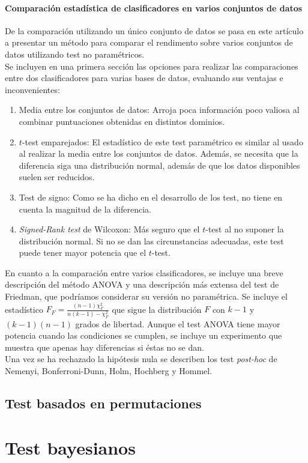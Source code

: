 \paragraph{Comparación estadística de clasificadores en varios conjuntos de datos} \cite{DEMSAR06} De la comparación utilizando un único conjunto de datos se pasa en este artículo a presentar un método para comparar el rendimento sobre varios conjuntos de datos utilizando test no paramétricos.\\
	Se incluyen en una primera sección las opciones para realizar las comparaciones entre dos clasificadores para varias bases de datos, evaluando sus ventajas e inconvenientes:
	\begin{enumerate}
	\item Media entre los conjuntos de datos: Arroja poca información poco valiosa al combinar puntuaciones obtenidas en distintos dominios.
	\item $t$-test emparejados: El estadístico de este test paramétrico es similar al usado al realizar la media entre los conjuntos de datos. Además, se necesita que la diferencia siga una distribución normal, además de que los datos disponibles suelen ser reducidos. 
	\item Test de signo: Como se ha dicho en el desarrollo de los test, no tiene en cuenta la magnitud de la diferencia.
	\item \textit{Signed-Rank test} de Wilcoxon: Más seguro que el $t$-test al no suponer la distribución normal. Si no se dan las circunstancias adecuadas, este test puede tener mayor potencia que el $t$-test.
	\end{enumerate}
	
	En cuanto a la comparación entre varios clasificadores, se incluye una breve descripción del método ANOVA y una descripción más extensa del test de Friedman, que podríamos considerar su versión no paramétrica. Se incluye el estadístico $F_F = \frac{(n-1) \chi^2_F}{n(k-1) - \chi^2_F}$ que sigue la distribución $F$ con $k-1$ y $(k-1)(n-1)$ grados de libertad. Aunque el test ANOVA tiene mayor potencia cuando las condiciones se cumplen, se incluye un experimento que muestra que apenas hay diferencias si éstas no se dan.\\
	Una vez se ha rechazado la hipótesis nula se describen los test \textit{post-hoc} de Nemenyi, Bonferroni-Dunn, Holm, Hochberg y Hommel.
	

	\subsection{Test basados en permutaciones}

\section{Test bayesianos}	
%